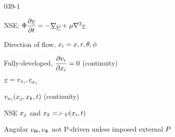 \begin{mitframe}{039-1}

\begin{listone}
\item NSE: $\diss\dfrac{\partial\uline{\vvel}}{\partial{t}}=-\gradop\uline{\dynpress}+\chempot\nabla^2\uline{\vvel}$
		\begin{listtwo}
          \item Direction of flow, $\specfrac{i}=\disp, \pos,\theta,\eleccoeff$
        
       	 \item Fully-developed, $\dfrac{\partial\vvel_{\state}}{\partial\specfrac{i}}=0$ (continuity)	
        
        		\item $\uline{\vvel}=\vvel_{\specfrac{i}},\uline{\e}_{\specfrac{i}} $
        
       			\item $\vvel_{\specfrac{i}}(\specfrac{j}, \specfrac{k},t)$ (continuity)
        
      \item NSE $\specfrac{j}$ and $\specfrac{k}=>\dynpress(\specfrac{i}, t)$
        
        				\begin{listthree}
                        
                        \item Angular $\vvel_{\dimltemp}, \vvel_{\pot}$ not P-driven unless imposed external $\p$

						\end{listthree}
              \end{listtwo}
\end{listone}

\end{mitframe}